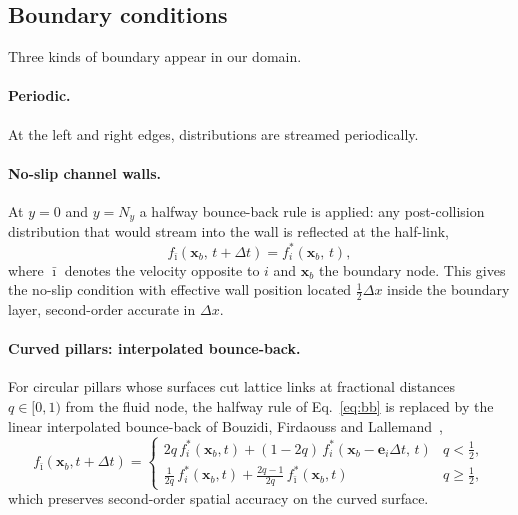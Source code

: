 \documentclass[11pt,a4paper]{article}
\begin{document}
\subsection{Boundary conditions}
\label{sec:methods-bc}

Three kinds of boundary appear in our domain.

\paragraph{Periodic.}
At the left and right edges, distributions are streamed periodically.

\paragraph{No-slip channel walls.}
At $y=0$ and $y=N_y$ a halfway bounce-back rule is applied: any
post-collision distribution that would stream into the wall is
reflected at the half-link,
\begin{equation}
f_{\bar\imath}(\boldsymbol x_b,\, t + \Delta t)
   = f_i^{*}(\boldsymbol x_b,\, t),
\label{eq:bb}
\end{equation}
where $\bar\imath$ denotes the velocity opposite to $i$ and
$\boldsymbol x_b$ the boundary node. This gives the no-slip
condition with effective wall position located $\tfrac{1}{2}\Delta x$
inside the boundary layer, second-order accurate in $\Delta x$.

\paragraph{Curved pillars: interpolated bounce-back.}
For circular pillars whose surfaces cut lattice links at fractional
distances $q \in [0,1)$ from the fluid node, the halfway rule of
Eq.~\eqref{eq:bb} is replaced by the linear interpolated
bounce-back of Bouzidi, Firdaouss and
Lallemand~\citep{bouzidi2001momentum},
\begin{equation}
f_{\bar\imath}(\boldsymbol x_b, t+\Delta t) =
\begin{cases}
2 q \, f_i^{*}(\boldsymbol x_b, t) +
   (1 - 2 q)\, f_i^{*}(\boldsymbol x_b - \boldsymbol e_i \Delta t,\, t)
   & q < \tfrac{1}{2},\\[2pt]
\tfrac{1}{2q}\, f_i^{*}(\boldsymbol x_b, t) +
   \tfrac{2q-1}{2q}\, f_{\bar\imath}^{*}(\boldsymbol x_b, t)
   & q \ge \tfrac{1}{2},
\end{cases}
\label{eq:bfl}
\end{equation}
which preserves second-order spatial accuracy on the curved surface.
\end{document}
